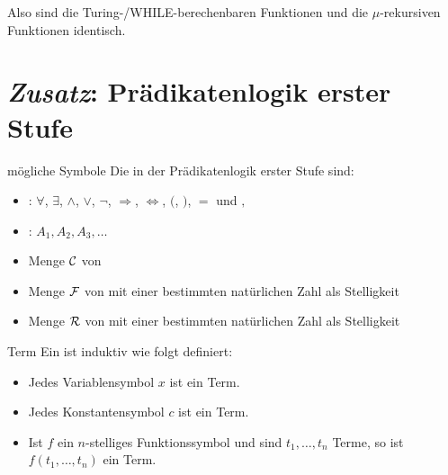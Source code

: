 \begin{Bem}
    Also sind die Turing-/WHILE-berechenbaren Funktionen und die $\mu$-rekursiven Funktionen
    identisch.
\end{Bem}

\pagebreak

\section{%
    \emph{Zusatz}:
    Prädikatenlogik erster Stufe%
}

\begin{Def}{mögliche Symbole}
    Die in der Prädikatenlogik erster Stufe  sind:
    \begin{itemize}
        \item
        : $\forall$, $\exists$, $\land$, $\lor$, $\lnot$, $\Rightarrow$,
        $\Leftrightarrow$, $($, $)$, $=$ und $,$

        \item
        : $A_1, A_2, A_3, \dotsc$

        \item
        Menge $\mathcal{C}$ von 

        \item
        Menge $\mathcal{F}$ von 
        mit einer bestimmten natürlichen Zahl als Stelligkeit

        \item
        Menge $\mathcal{R}$ von 
        mit einer bestimmten natürlichen Zahl als Stelligkeit
    \end{itemize}
\end{Def}

\linie

\begin{Def}{Term}
    Ein  ist induktiv wie folgt definiert:
    \begin{itemize}
        \item
        Jedes Variablensymbol $x$ ist ein Term.

        \item
        Jedes Konstantensymbol $c$ ist ein Term.

        \item
        Ist $f$ ein $n$-stelliges Funktionssymbol und sind $t_1, \dotsc, t_n$
        Terme, so ist $f(t_1, \dotsc, t_n)$ ein Term.
    \end{itemize}
\end{Def}

